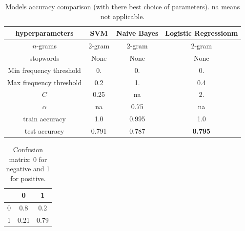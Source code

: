 \documentclass[10pt]{article}
\begin{document}
\begin{table}[h!]
    \centering
    \begin{tabular}{ |c|c|c|c| } 
        \hline
        hyperparameters & SVM &		Naive Bayes &		Logistic Regressionm	\\
        \hline
        $n$-grams 	&	2-gram 	&	2-gram	&	2-gram 	\\
        stopwords 	&	None	&	None	&	None	\\
        Min frequency threshold 	&	0.	&	0.	&	0.	\\
        Max frequency threshold 	&	0.2	&	1.	&	0.4	\\
        $C$	&	0.25	&	na & 2.			\\
        $\alpha$	&	na	&	0.75 & na \\			
        train accuracy 	&	1.0	&	0.995	&	1.0	\\
        test accuracy 	&	0.791	&	0.787	&	\textbf{0.795}	\\
        \hline
    \end{tabular}
    \caption{Models accuracy comparison (with there best choice of parameters). na means not applicable.}
    \label{table:result}
\end{table} 

\begin{table}[h!]
    \centering
    \begin{tabular}{ c|c|c| }
        & 0 & 1 \\
        \hline
        0 & 0.8 & 0.2 \\     
        \hline
        1 & 0.21 & 0.79 \\
        \hline
    \end{tabular}
    \caption{Confusion matrix: 0 for negative and 1 for positive.}
    \label{table:result}
\end{table}
\end{document}
